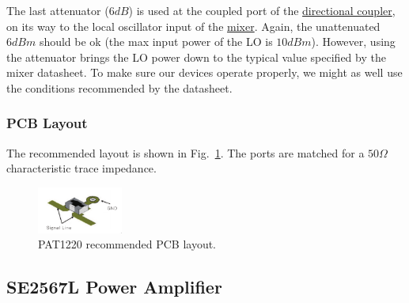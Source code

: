 The last attenuator ($6 \si{dB}$) is used at the coupled port of the
\hyperref[sec:dc4759j5020ahf]{directional coupler}, on its way to the local oscillator input of the
\hyperref[sec:adl5802]{mixer}. Again, the unattenuated $6 \si{dBm}$ should be ok (the max input
power of the LO is $10 \si{dBm}$). However, using the attenuator brings the LO power down to the
typical value specified by the mixer datasheet. To make sure our devices operate properly, we might
as well use the conditions recommended by the datasheet.

\subsubsection{PCB Layout}
\label{sec:pat1220-pcb-layout}

The recommended layout is shown in Fig.~\ref{fig:pat1220-pcb}. The ports are matched for a $50
\si{\Omega}$ characteristic trace impedance.

\begin{figure}[h]
        \centering
        \includegraphics[width=0.25\textwidth]{data/pat1220-pcb}
        \caption{PAT1220 recommended PCB layout.}
        \label{fig:pat1220-pcb}
\end{figure}

\subsection{SE2567L Power Amplifier}
\label{sec:se2567l-power-amp}


